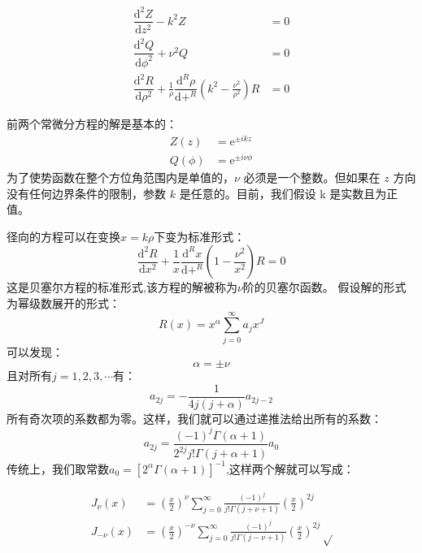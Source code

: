\documentclass[lang=cn,10pt,newtx,bibend=biber,device=pad]{elegantbook}
\newcommand{\ee}{\mathrm{e}}
\newcommand{\deri}[3]{\dfrac{\mathrm{d}^{#1}#2}{\mathrm{d}#3^{#1}}}%
\begin{document}
    \begin{align}
        \deri{2}{Z}{z}-k^2Z &= 0 \\
        \deri{2}{Q}{\phi}+\nu^2Q &= 0 \\
        \deri{2}{R}{\rho}+\frac{1}{\rho}\deri{R}{\rho}+\left(k^2-\frac{\nu^2}{\rho^2}\right)R &= 0
    \end{align}

前两个常微分方程的解是基本的：
\begin{equation}\label{eq:3.74}
    \begin{aligned}
        Z(z)&=\ee^{\pm ikz} \\
        Q(\phi)&=\ee^{\pm i\nu\phi}
    \end{aligned}
\end{equation}
为了使势函数在整个方位角范围内是单值的，$\nu$ 必须是一个整数。但如果在 $z$ 方向没有任何边界条件的限制，参数 $k$ 是任意的。目前，我们假设 k 是实数且为正值。

径向的方程可以在变换$x=k\rho$下变为标准形式：
\begin{equation}\label{eq:3.75}
    \deri{2}{R}{x}+\frac{1}{x}\deri{R}{x}+\left(1-\frac{\nu^2}{x^2}\right)R=0
\end{equation}
这是贝塞尔方程的标准形式,该方程的解被称为$\nu$阶的贝塞尔函数。
假设解的形式为幂级数展开的形式：
\begin{equation}\label{eq:3.76}
    R(x)=x^\alpha\sum_{j=0}^{\infty}a_jx^J
\end{equation}
可以发现：
\begin{equation}\label{eq:3.77}
    \alpha = \pm \nu
\end{equation}
且对所有$j=1,2,3,\cdots$有：
\begin{equation}\label{eq:3.78}
    a_{2j}=-\frac{1}{4j(j+\alpha)}a_{2j-2}
\end{equation}
所有奇次项的系数都为零。这样，我们就可以通过递推法给出所有的系数：
\begin{equation}
    a_{2j}=\frac{(-1)^j\Gamma(\alpha+1)}{2^{2j}j!\Gamma(j+\alpha+1)}a_0
\end{equation}
传统上，我们取常数$a_0 = [2^\alpha \Gamma(\alpha+1)]^{-1}$,这样两个解就可以写成：

\begin{align}
    J_\nu (x) &= (\frac{x}{2})^\nu \sum_{j=0}^{\infty}\frac{(-1)^j}{j!\Gamma(j+\nu+1)}(\frac{x}{2})^{2j} \label{eq:3.82}\\
    J_{-\nu}(x) &= (\frac{x}{2})^{-\nu}\sum_{j=0}^{\infty}\frac{(-1)^j}{j!\Gamma(j-\nu+1)}(\frac{x}{2})^{2j}√\label{eq:3.83}
\end{align}
\end{document}
